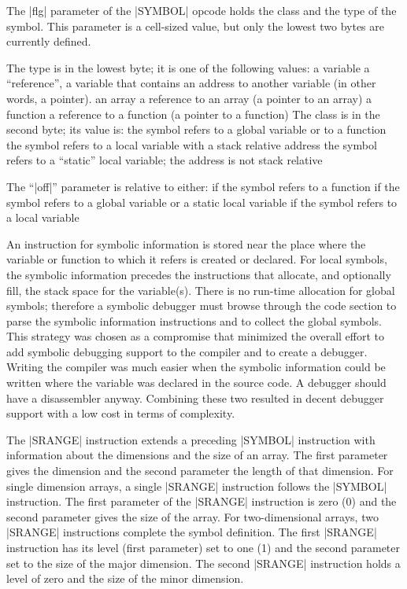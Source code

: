 The |flg| parameter of the |SYMBOL| opcode holds the class and the type of
the symbol. This parameter is a cell-sized value, but only the lowest two bytes
are currently defined.

The type is in the lowest byte; it is one of the following values:
\beginlist{30pt}\compactlist
{} a variable
 a ``reference'', a variable that contains an address to another
  variable (in other words, a pointer).
 an array
 a reference to an array (a pointer to an array)
 a function
 a reference to a function (a pointer to a function)
\endlist
The class is in the second byte; its value is:
\beginlist{30pt}\compactlist
{} the symbol refers to a global variable or to a function
 the symbol refers to a local variable with a stack relative address
 the symbol refers to a ``static'' local variable; the address is not
  stack relative
\endlist

The ``|off|'' parameter is relative to either:
\beginlist{30pt}\compactlist
{} if the symbol refers to a function
 if the symbol refers to a global variable or a static local
  variable
 if the symbol refers to a local variable
\endlist

An instruction for symbolic information is stored near the place where the
variable or function to which it refers is created or declared. For local
symbols, the symbolic information precedes the instructions that allocate,
and optionally fill, the stack space for the variable(s). There is no
run-time allocation for global symbols; therefore a symbolic debugger must
browse through the code section to parse the symbolic information instructions
and to collect the global symbols. This strategy was chosen as a compromise
that minimized the overall effort to add symbolic debugging support to the
compiler and to create a debugger. Writing the compiler was much easier when
the symbolic information could be written where the variable was declared in
the source code. A debugger should have a disassembler anyway. Combining these
two resulted in decent debugger support with a low cost in terms of
complexity.

The |SRANGE| instruction extends a preceding |SYMBOL| instruction with
information about the dimensions and the size of an array. The first parameter
gives the dimension and the second parameter the length of that dimension.
\beginlist{1em}\compactlist
\list{\lbullet}
  For single dimension arrays, a single |SRANGE| instruction follows the
  |SYMBOL| instruction. The first parameter of the |SRANGE| instruction
  is zero (0) and the second parameter gives the size of the array.
\list{\lbullet}
  For two-dimensional arrays, two |SRANGE| instructions complete the symbol
  definition. The first |SRANGE| instruction has its level (first parameter)
  set to one (1) and the second parameter set to the size of the major
  dimension. The second |SRANGE| instruction holds a level of zero and the
  size of the minor dimension.
\endlist

